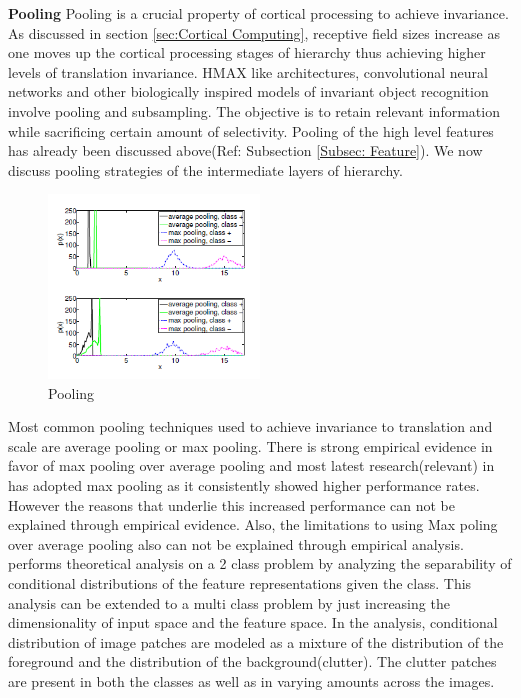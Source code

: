 \documentclass[12pt,twoside]{article}
\theoremstyle{plain}
\theoremstyle{definition}
\theoremstyle{remark}
\begin{document}
\textbf{Pooling}
Pooling is a crucial property of cortical processing to achieve invariance. As discussed in section \ref{sec:Cortical Computing}, receptive field sizes increase as one moves up the cortical processing stages of hierarchy thus achieving higher levels of translation invariance. HMAX like architectures, convolutional neural networks and other biologically inspired models of invariant object recognition involve pooling and subsampling. The objective is to retain relevant information while sacrificing certain amount of selectivity. Pooling of the high level features has already been discussed above(Ref: Subsection \ref{Subsec: Feature}). We now discuss pooling strategies of the intermediate layers of hierarchy.
\begin{figure} 
	\begin{centering}
		\includegraphics[width=0.5\textwidth]{pooling}
		\caption{Pooling}
	\end{centering}
  \label{fig:pooling}
\end{figure}
Most common pooling techniques used to achieve invariance to translation and scale are average pooling or max pooling. There is strong empirical evidence in favor of max pooling over average pooling\cite{Y-LanBoureau2010} and most latest research(relevant) in has adopted max pooling as it consistently showed higher performance rates. However the reasons that underlie this increased performance can not be explained through empirical evidence. Also, the limitations to using Max poling over average pooling also can not be explained through empirical analysis. \cite{Y-LanBoureau2010a} performs theoretical analysis on a 2 class problem by analyzing the separability of conditional distributions of the feature representations given the class. This analysis can be extended to a multi class problem by just increasing the dimensionality of input space and the feature space. In the analysis, conditional distribution of image patches are modeled as a mixture of the distribution of the foreground and the distribution of the background(clutter). The clutter patches are present in both the classes as well as in varying amounts across the images.
\end{document}
